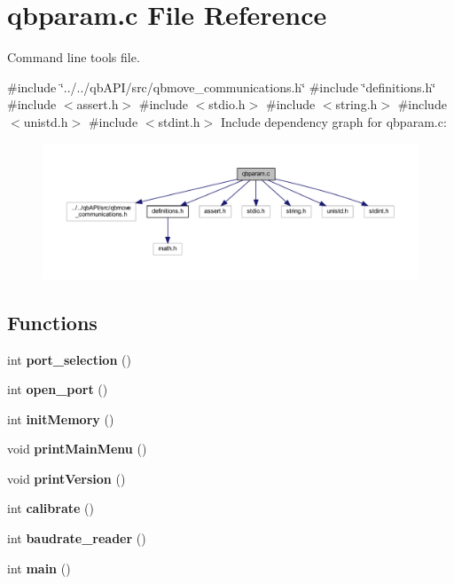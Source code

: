 \section{qbparam.\+c File Reference}
\label{qbparam_8c}


Command line tools file.  


{\ttfamily \#include \char`\"{}../../qb\+A\+P\+I/src/qbmove\+\_\+communications.\+h\char`\"{}}\newline
{\ttfamily \#include \char`\"{}definitions.\+h\char`\"{}}\newline
{\ttfamily \#include $<$assert.\+h$>$}\newline
{\ttfamily \#include $<$stdio.\+h$>$}\newline
{\ttfamily \#include $<$string.\+h$>$}\newline
{\ttfamily \#include $<$unistd.\+h$>$}\newline
{\ttfamily \#include $<$stdint.\+h$>$}\newline
Include dependency graph for qbparam.\+c\+:
\nopagebreak
\begin{figure}[H]
\begin{center}
\leavevmode
\includegraphics[width=350pt]{qbparam_8c__incl}
\end{center}
\end{figure}
\subsection*{Functions}
\begin{DoxyCompactItemize}
\item 
\mbox{\label{qbparam_8c_a3939d4ef4a0e2be02b1eb9e1994ec985}} 
int {\bfseries port\+\_\+selection} ()
\item 
\mbox{\label{qbparam_8c_abe553924eef0ba8079dc745caf1f348c}} 
int {\bfseries open\+\_\+port} ()
\item 
\mbox{\label{qbparam_8c_a564e2594b1cf22357d72b2e2cf7fdaf3}} 
int {\bfseries init\+Memory} ()
\item 
\mbox{\label{qbparam_8c_af9dce1973196a5934ee5ec20ea417324}} 
void {\bfseries print\+Main\+Menu} ()
\item 
\mbox{\label{qbparam_8c_a9c4b081f1e1ad60def15811c71a936f2}} 
void {\bfseries print\+Version} ()
\item 
\mbox{\label{qbparam_8c_aa78cef14864eb28be4f47d1ebf0e29f1}} 
int {\bfseries calibrate} ()
\item 
int \textbf{ baudrate\+\_\+reader} ()
\item 
\mbox{\label{qbparam_8c_ae66f6b31b5ad750f1fe042a706a4e3d4}} 
int {\bfseries main} ()
\end{DoxyCompactItemize}
